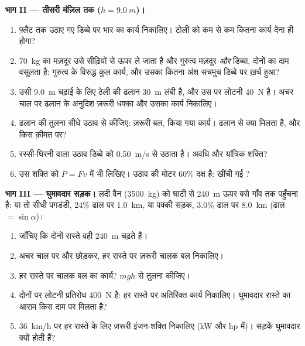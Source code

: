 \begin{problem}
\medskip
\noindent\textbf{भाग II --- तीसरी मंज़िल तक ($h = \qty{9.0}{m}$)।}
\begin{enumerate}[resume]
  \item फ़्लैट तक उठाए गए डिब्बे पर भार का कार्य निकालिए।
        टोली को कम से कम कितना कार्य देना ही होगा?
  \item \qty{70}{kg} का मज़दूर उसे सीढ़ियों से ऊपर ले जाता है और गुरुत्व मज़दूर
        \emph{और} डिब्बा, दोनों का दाम वसूलता है: गुरुत्व के विरुद्ध कुल
        कार्य, और उसका कितना अंश सचमुच डिब्बे पर ख़र्च हुआ?
  \item उसी \qty{9.0}{m} चढ़ाई के लिए ठेली की ढलान \qty{30}{m} लंबी है, और उस पर
        लोटनी  \qty{40}{N} है। अचर चाल पर ढलान के अनुदिश ज़रूरी
        धक्का और उसका कार्य निकालिए।
  \item ढलान की तुलना सीधे  उठाव से कीजिए: ज़रूरी बल, किया
        गया कार्य। ढलान से क्या मिलता है, और किस क़ीमत पर?
  \item रस्सी-घिरनी वाला उठाव डिब्बे को \qty{0.50}{m/s} से उठाता है। अवधि और
        यांत्रिक शक्ति?
  \item उस शक्ति को $P = Fv$ में भी लिखिए। उठाव की मोटर
        $60\%$ दक्ष है: खींची गई ?
\end{enumerate}

\medskip
\noindent\textbf{भाग III --- घुमावदार सड़क।}
लदी वैन (\qty{3500}{kg}) को घाटी से \qty{240}{m} ऊपर बसे गाँव तक पहुँचना है: या तो सीधी
पगडंडी, $24\%$ ढाल पर \qty{1.0}{km}, या पक्की सड़क, $3.0\%$ ढाल पर \qty{8.0}{km} (ढाल
$= \sin\alpha$)।
\begin{enumerate}[resume]
  \item जाँचिए कि दोनों रास्ते वही \qty{240}{m} चढ़ते हैं।
  \item अचर चाल पर और  छोड़कर, हर रास्ते पर ज़रूरी चालक
        बल निकालिए।
  \item हर रास्ते पर चालक बल का कार्य? $mgh$ से तुलना
        कीजिए।
  \item दोनों पर लोटनी प्रतिरोध \qty{400}{N} है: हर रास्ते पर अतिरिक्त
        कार्य निकालिए। घुमावदार रास्ते का आराम किस दाम पर मिलता है?
  \item \qty{36}{km/h} पर हर रास्ते के लिए ज़रूरी इंजन-शक्ति निकालिए
        (\unit{kW} और \unit{hp} में)। सड़कें घुमावदार क्यों होती हैं?
\end{enumerate}


\end{problem}
